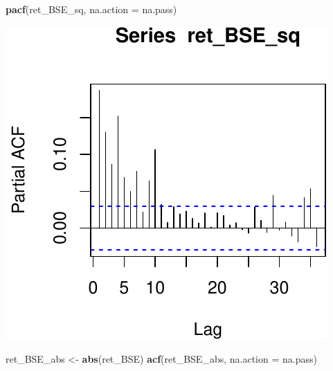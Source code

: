 \documentclass[11pt,]{article}
\newenvironment{Shaded}{\begin{snugshade}}{\end{snugshade}}
\newcommand{\KeywordTok}[1]{\textcolor[rgb]{0.13,0.29,0.53}{\textbf{#1}}}
\newcommand{\DataTypeTok}[1]{\textcolor[rgb]{0.13,0.29,0.53}{#1}}
\newcommand{\StringTok}[1]{\textcolor[rgb]{0.31,0.60,0.02}{#1}}
\newcommand{\NormalTok}[1]{#1}
\begin{document}
\begin{Shaded}
\begin{Highlighting}[]
\KeywordTok{pacf}\NormalTok{(ret_BSE_sq, }\DataTypeTok{na.action =}\NormalTok{ na.pass)}
\end{Highlighting}
\end{Shaded}

\begin{center}\includegraphics{FMC_T4_PhD_ARMA_GARCH_files/figure-latex/BSE_ret_ACF_sq-2} \end{center}

\begin{Shaded}
\begin{Highlighting}[]
\NormalTok{ret_BSE_abs <-}\StringTok{ }\KeywordTok{abs}\NormalTok{(ret_BSE)}
\KeywordTok{acf}\NormalTok{(ret_BSE_abs, }\DataTypeTok{na.action =}\NormalTok{ na.pass)}
\end{Highlighting}
\end{Shaded}
\end{document}
